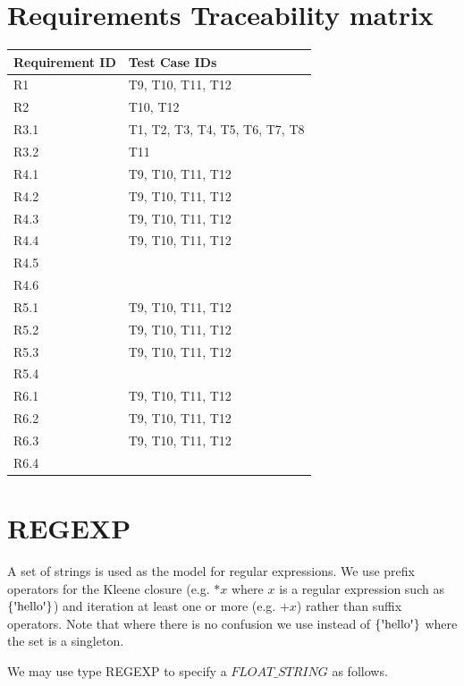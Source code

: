 \documentclass[runningheads,12pt]{article}
\begin{document}
\section{Requirements Traceability matrix}

\begin{tabular}{|p{1.5in}|p{3.5in}|}
\hline
\textbf{Requirement ID}	 & \textbf{Test Case IDs}\\ 
\hline
R1 & T9, T10, T11, T12\\
\hline
R2 & T10, T12\\
\hline
R3.1 & T1, T2, T3, T4, T5, T6, T7, T8\\
\hline
R3.2 & T11\\
\hline
R4.1 & T9, T10, T11, T12\\
\hline
R4.2 & T9, T10, T11, T12\\
\hline
R4.3 & T9, T10, T11, T12\\
\hline
R4.4 & T9, T10, T11, T12\\
\hline
R4.5 & \\
\hline
R4.6 & \\
\hline
R5.1 & T9, T10, T11, T12\\
\hline
R5.2 & T9, T10, T11, T12\\
\hline
R5.3 & T9, T10, T11, T12\\
\hline
R5.4 & \\
\hline
R6.1 & T9, T10, T11, T12\\
\hline
R6.2 & T9, T10, T11, T12\\
\hline
R6.3 & T9, T10, T11, T12\\
\hline
R6.4 & \\
\hline
\end{tabular}




\newpage
\appendix

\section{REGEXP}


A set of strings is used as the model for regular expressions. We use prefix operators for the Kleene closure (e.g. $*x$ where $x$ is a regular expression such as $\{\squote{hello}\}$) and iteration at least one or more (e.g. $\textrm{+}x$) rather than suffix operators. Note that where there is no confusion we use  instead of $\{\squote{hello}\}$ where the set is a singleton. 

We may use type REGEXP to specify a $FLOAT\_STRING$ as follows.
\end{document}
